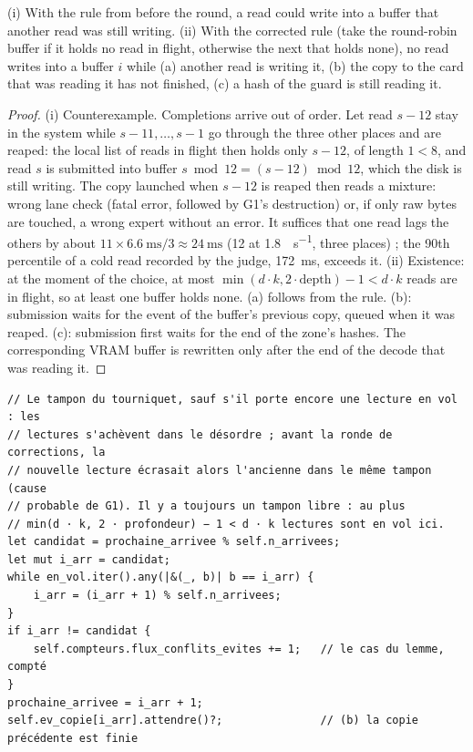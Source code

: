 \begin{lemme}\label{t2e-lem:tampons}
(i) With the rule from before the round, a read could write into a buffer that another read was still writing. (ii) With the corrected rule (take the round-robin buffer if it holds no read in flight, otherwise the next that holds none), no read writes into a buffer $i$ while (a) another read is writing it, (b) the copy to the card that was reading it has not finished, (c) a hash of the guard is still reading it.
\end{lemme}
\begin{proof}
(i) Counterexample. Completions arrive out of order. Let read $s-12$ stay in the system while $s-11, \dots, s-1$ go through the three other places and are reaped: the local list of reads in flight then holds only $s-12$, of length $1 < 8$, and read $s$ is submitted into buffer $s \bmod 12 = (s-12) \bmod 12$, which the disk is still writing. The copy launched when $s-12$ is reaped then reads a mixture: wrong lane check (fatal error, followed by G1's destruction) or, if only raw bytes are touched, a wrong expert without an error. It suffices that one read lags the others by about $11 \times \SI{6.6}{\milli\second} / 3 \approx \SI{24}{\milli\second}$ (\SI{12}{\Mo} at \SI{1.8}{\Go\per\second}, three places) \calc; the 90th percentile of a cold read recorded by the judge, \SI{172}{\milli\second}, exceeds it.
(ii) Existence: at the moment of the choice, at most $\min(d\cdot k, 2 \cdot \text{depth}) - 1 < d \cdot k$ reads are in flight, so at least one buffer holds none. (a) follows from the rule. (b): submission waits for the event of the buffer's previous copy, queued when it was reaped. (c): submission first waits for the end of the zone's hashes. The corresponding VRAM buffer is rewritten only after the end of the decode that was reading it.
\end{proof}

\begin{lstlisting}[language=RustRes, caption={The choice of an arrival buffer in stream prefill, after the round (\fichier{moteur/crates/trc-ordo/src/lib.rs}, excerpt; the code's comments are in French).}, label=t2e-lst:tampon]
// Le tampon du tourniquet, sauf s'il porte encore une lecture en vol : les
// lectures s'achèvent dans le désordre ; avant la ronde de corrections, la
// nouvelle lecture écrasait alors l'ancienne dans le même tampon (cause
// probable de G1). Il y a toujours un tampon libre : au plus
// min(d · k, 2 · profondeur) − 1 < d · k lectures sont en vol ici.
let candidat = prochaine_arrivee % self.n_arrivees;
let mut i_arr = candidat;
while en_vol.iter().any(|&(_, b)| b == i_arr) {
    i_arr = (i_arr + 1) % self.n_arrivees;
}
if i_arr != candidat {
    self.compteurs.flux_conflits_evites += 1;   // le cas du lemme, compté
}
prochaine_arrivee = i_arr + 1;
self.ev_copie[i_arr].attendre()?;               // (b) la copie précédente est finie
\end{lstlisting}

